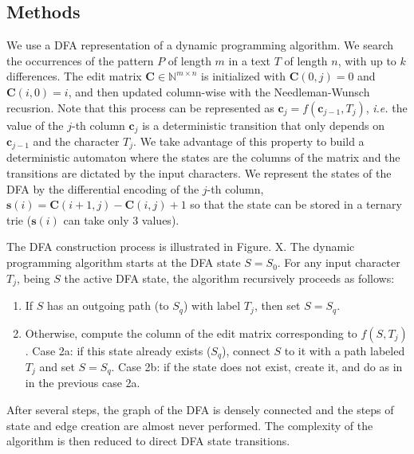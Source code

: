 \documentclass{bioinfo}
\begin{document}
\begin{methods}
\section{Methods}

We use a DFA representation of a dynamic programming algorithm.
We search the occurrences of the pattern $P$ of length $m$
in a text $T$ of length $n$, with up to $k$ differences.
The edit matrix $\mathbf{C} \in \mathbb{N}^{m\times n}$ is initialized
with $\mathbf{C}(0,j)=0$ and $\mathbf{C}(i,0) = i$, and then updated
column-wise with the Needleman-Wunsch recusrion. Note that this process
can be represented as $\mathbf{c}_j=f(\mathbf{c}_{j-1},T_j)$,
\textit{i.e.} the value of the $j$-th column $\mathbf{c}_{j}$ is a
deterministic transition that only depends on $\mathbf{c}_{j-1}$ and the
character $T_j$. We take advantage of this property to build a
deterministic automaton where the states are the columns of the matrix
and the transitions are dictated by the input characters.
We represent the states of the DFA by the differential encoding
of the $j$-th column, $\mathbf{s}(i)=\mathbf{C}(i+1,j)-\mathbf{C}(i,j)+1$
so that the state can be stored in a ternary trie ($\mathbf{s}(i)$
can take only 3 values).

\begin{figure}[!tpb]
\caption{}\label{matrix}
\end{figure}

The DFA construction process is illustrated in Figure. X. The
dynamic programming algorithm starts at the DFA state
$S = S_0$. For any input character $T_j$, being $S$
the active DFA state, the algorithm recursively proceeds as follows:
\begin{enumerate}
\item If $S$ has an outgoing path (to $S_q$) with
label $T_j$, then set $S = S_q$.
\item Otherwise, compute the column of the edit matrix corresponding
to $f(S, T_j)$. Case 2a: if this state already exists ($S_q$), connect
$S$ to it with a path labeled $T_j$ and set $S = S_q$. Case 2b: if
the state does not exist, create it, and do as in in the previous
case 2a.
\end{enumerate}

After several steps, the graph of the DFA is densely connected and
the steps of state and edge creation are almost never performed. 
The complexity of the algorithm is then reduced to direct DFA state
transitions.

\end{methods}
\end{document}
